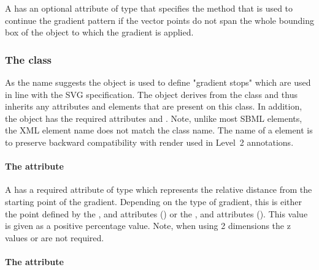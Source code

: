 A \GradientBase has an optional attribute  of type
\GradientSpreadMethod that specifies the method that is
used to continue the gradient pattern if the vector points do not span the whole
bounding box of the object to which the gradient is applied. 

%
%

\subsubsection{The  class}
\label{gradientstop-class}

As the name suggests the \GradientStop object is used to define "gradient stops" 
which are used in line with the SVG specification.
The \GradientStop object derives from the \SBase class and thus inherits
any attributes and elements that are present on this class.
In addition, the \GradientStop object has the required attributes 
and . Note, unlike most SBML elements, the XML element name does not match the class name. The name of a \GradientStop element is  to preserve backward compatibility with render used in Level~2 annotations.

\paragraph{The \fixttspace{} attribute}

A \GradientStop has a required attribute  of type
\RelAbsVector which represents the relative distance from the starting point of 
the gradient. Depending on the type of gradient, this is either the point 
defined by the , and  attributes (\LinearGradient) 
or the ,  and  attributes (\RadialGradient). 
This value is given as a positive percentage value. Note, when using 2 dimensions the z values  or  are not required.

\paragraph{The \fixttspace{} attribute}

